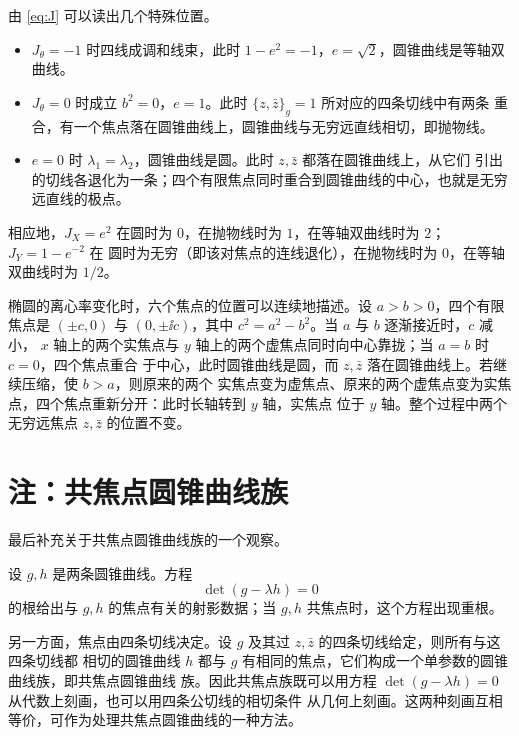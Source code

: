 由 \eqref{eq:J} 可以读出几个特殊位置。
\begin{itemize}
\item $J_\theta=-1$ 时四线成调和线束，此时 $1-e^2=-1$，$e=\sqrt2$，圆锥曲线是等轴双曲线。
\item $J_\theta=0$ 时成立 $b^2=0$，$e=1$。此时 $\{z,\bar z\}_g=1$ 所对应的四条切线中有两条
重合，有一个焦点落在圆锥曲线上，圆锥曲线与无穷远直线相切，即抛物线。
\item $e=0$ 时 $\lambda_1=\lambda_2$，圆锥曲线是圆。此时 $z,\bar z$ 都落在圆锥曲线上，从它们
引出的切线各退化为一条；四个有限焦点同时重合到圆锥曲线的中心，也就是无穷远直线的极点。
\end{itemize}
相应地，$J_X=e^2$ 在圆时为 $0$，在抛物线时为 $1$，在等轴双曲线时为 $2$；$J_Y=1-e^{-2}$ 在
圆时为无穷（即该对焦点的连线退化），在抛物线时为 $0$，在等轴双曲线时为 $1/2$。

椭圆的离心率变化时，六个焦点的位置可以连续地描述。设 $a>b>0$，四个有限焦点是
$(\pm c,0)$ 与 $(0,\pm\ii c)$，其中 $c^2=a^2-b^2$。当 $a$ 与 $b$ 逐渐接近时，$c$ 减小，
$x$ 轴上的两个实焦点与 $y$ 轴上的两个虚焦点同时向中心靠拢；当 $a=b$ 时 $c=0$，四个焦点重合
于中心，此时圆锥曲线是圆，而 $z,\bar z$ 落在圆锥曲线上。若继续压缩，使 $b>a$，则原来的两个
实焦点变为虚焦点、原来的两个虚焦点变为实焦点，四个焦点重新分开：此时长轴转到 $y$ 轴，实焦点
位于 $y$ 轴。整个过程中两个无穷远焦点 $z,\bar z$ 的位置不变。

\section{注：共焦点圆锥曲线族}

最后补充关于共焦点圆锥曲线族的一个观察。

\begin{remark}[共焦点族]
设 $g,h$ 是两条圆锥曲线。方程
\[
\det(g-\lambda h)=0
\]
的根给出与 $g,h$ 的焦点有关的射影数据；当 $g,h$ 共焦点时，这个方程出现重根。

另一方面，焦点由四条切线决定。设 $g$ 及其过 $z,\bar z$ 的四条切线给定，则所有与这四条切线都
相切的圆锥曲线 $h$ 都与 $g$ 有相同的焦点，它们构成一个单参数的圆锥曲线族，即共焦点圆锥曲线
族。因此共焦点族既可以用方程 $\det(g-\lambda h)=0$ 从代数上刻画，也可以用四条公切线的相切条件
从几何上刻画。这两种刻画互相等价，可作为处理共焦点圆锥曲线的一种方法。
\end{remark}

